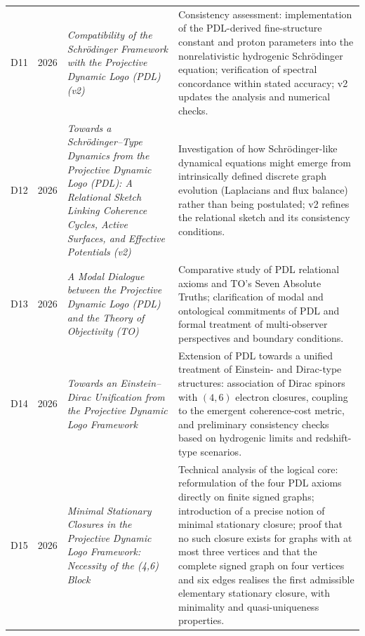 \documentclass{article}
\begin{document}
\begin{longtable}{@{}llL{4cm}p{9.5cm}@{}}
D11 & 2026 & \textit{Compatibility of the Schr\"odinger Framework with the Projective Dynamic Logo (PDL) (v2)} &
Consistency assessment: implementation of the PDL-derived fine-structure constant and proton parameters into the nonrelativistic hydrogenic Schr\"odinger equation; verification of spectral concordance within stated accuracy; v2 updates the analysis and numerical checks. \citep{Schrodinger_PDL_v2_2026} \\[0.5em]

D12 & 2026 & \textit{Towards a Schr\"odinger--Type Dynamics from the Projective Dynamic Logo (PDL): A Relational Sketch Linking Coherence Cycles, Active Surfaces, and Effective Potentials (v2)} &
Investigation of how Schr\"odinger-like dynamical equations might emerge from intrinsically defined discrete graph evolution (Laplacians and flux balance) rather than being postulated; v2 refines the relational sketch and its consistency conditions. \citep{Schrodinger_Sketch_v2_2026} \\[0.5em]

D13 & 2026 & \textit{A Modal Dialogue between the Projective Dynamic Logo (PDL) and the Theory of Objectivity (TO)} &
Comparative study of PDL relational axioms and TO's Seven Absolute Truths; clarification of modal and ontological commitments of PDL and formal treatment of multi-observer perspectives and boundary conditions. \citep{PDL_TO_dialogue} \\[0.5em]

D14 & 2026 & \textit{Towards an Einstein--Dirac Unification from the Projective Dynamic Logo Framework} &
Extension of PDL towards a unified treatment of Einstein- and Dirac-type structures: association of Dirac spinors with $(4,6)$ electron closures, coupling to the emergent coherence-cost metric, and preliminary consistency checks based on hydrogenic limits and redshift-type scenarios. \citep{Einstein_Dirac_PDL_2026} \\[0.5em]

D15 & 2026 & \textit{Minimal Stationary Closures in the Projective Dynamic Logo Framework: Necessity of the (4,6) Block} &
Technical analysis of the logical core: reformulation of the four PDL axioms directly on finite signed graphs; introduction of a precise notion of minimal stationary closure; proof that no such closure exists for graphs with at most three vertices and that the complete signed graph on four vertices and six edges realises the first admissible elementary stationary closure, with minimality and quasi-uniqueness properties. \citep{Minimal_Stationary_Closures_2026} \\[0.5em]


\end{longtable}
\end{document}

